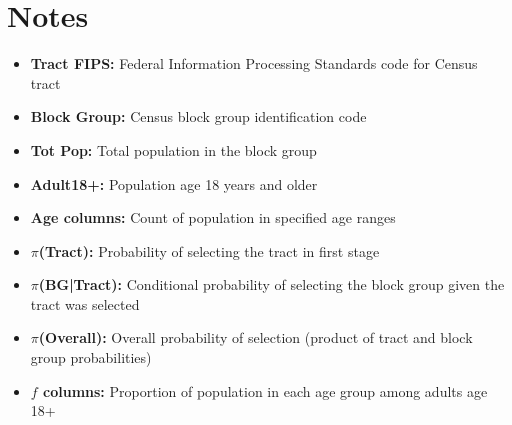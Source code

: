 \documentclass[11pt]{article}
\begin{document}
\clearpage

\section*{Notes}

\begin{itemize}
\item \textbf{Tract FIPS:} Federal Information Processing Standards code for Census tract
\item \textbf{Block Group:} Census block group identification code
\item \textbf{Tot Pop:} Total population in the block group
\item \textbf{Adult18+:} Population age 18 years and older
\item \textbf{Age columns:} Count of population in specified age ranges
\item \textbf{$\pi$(Tract):} Probability of selecting the tract in first stage
\item \textbf{$\pi$(BG|Tract):} Conditional probability of selecting the block group given the tract was selected
\item \textbf{$\pi$(Overall):} Overall probability of selection (product of tract and block group probabilities)
\item \textbf{$f$ columns:} Proportion of population in each age group among adults age 18+
\end{itemize}
\end{document}
